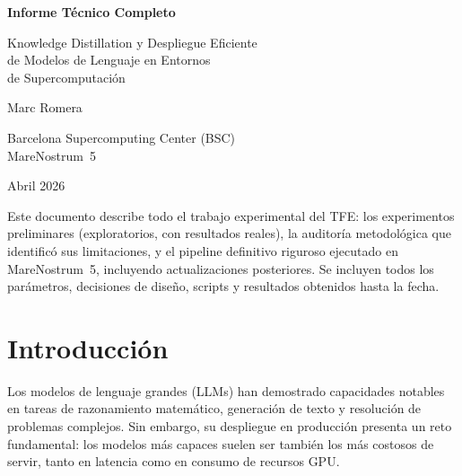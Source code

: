 \documentclass[11pt,a4paper]{article}
\begin{document}
\begin{titlepage}
\centering
\vspace*{3cm}
{\Huge\bfseries Informe T\'ecnico Completo\par}
\vspace{0.6cm}
{\LARGE Knowledge Distillation y Despliegue Eficiente\\[4pt]
de Modelos de Lenguaje en Entornos\\[4pt]de Supercomputaci\'on\par}
\vspace{2.5cm}
{\large Marc Romera\par}
\vspace{0.4cm}
{\large Barcelona Supercomputing Center (BSC)\\MareNostrum~5\par}
\vspace{0.4cm}
{\large Abril 2026\par}
\vfill
\begin{infobox}
\small
Este documento describe todo el trabajo experimental del TFE: los
experimentos preliminares (exploratorios, con resultados reales), la
auditor\'ia metodol\'ogica que identific\'o sus limitaciones, y el
pipeline definitivo riguroso ejecutado en MareNostrum~5, incluyendo
actualizaciones posteriores. Se incluyen todos los par\'ametros,
decisiones de dise\~no, scripts y resultados obtenidos hasta la fecha.
\end{infobox}
\end{titlepage}

\tableofcontents
\newpage

\section{Introducci\'on}
\label{sec:intro}

Los modelos de lenguaje grandes (LLMs) han demostrado capacidades
notables en tareas de razonamiento matem\'atico, generaci\'on de texto
y resoluci\'on de problemas complejos. Sin embargo, su despliegue en
producci\'on presenta un reto fundamental: los modelos m\'as capaces
suelen ser tambi\'en los m\'as costosos de servir, tanto en latencia
como en consumo de recursos GPU.
\end{document}
